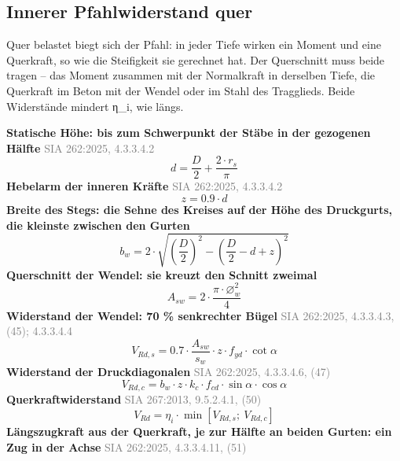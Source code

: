 \documentclass[11pt,a4paper]{article}
\newcommand{\normref}[1]{{\small\textcolor{gray}{#1}}}
\begin{document}
\subsection{Innerer Pfahlwiderstand quer}
Quer belastet biegt sich der Pfahl: in jeder Tiefe wirken ein Moment und eine Querkraft, so wie die Steifigkeit sie gerechnet hat. Der Querschnitt muss beide tragen -- das Moment zusammen mit der Normalkraft in derselben Tiefe, die Querkraft im Beton mit der Wendel oder im Stahl des Tragglieds. Beide Widerstände mindert η\_i, wie längs.

\noindent\textbf{Statische Höhe: bis zum Schwerpunkt der Stäbe in der gezogenen Hälfte} \hfill \normref{SIA 262:2025, 4.3.3.4.2}
\begin{equation*}
d = \frac{D}{2} + \frac{2 \cdot r_s}{\pi}
\end{equation*}
\noindent\textbf{Hebelarm der inneren Kräfte} \hfill \normref{SIA 262:2025, 4.3.3.4.2}
\begin{equation*}
z = 0.9 \cdot d
\end{equation*}
\noindent\textbf{Breite des Stegs: die Sehne des Kreises auf der Höhe des Druckgurts, die kleinste zwischen den Gurten}
\begin{equation*}
b_w = 2 \cdot \sqrt{\left(\frac{D}{2}\right)^{2} - \left(\frac{D}{2} - d + z\right)^{2}}
\end{equation*}
\noindent\textbf{Querschnitt der Wendel: sie kreuzt den Schnitt zweimal}
\begin{equation*}
A_{sw} = 2 \cdot \frac{\pi \cdot \varnothing_w^{2}}{4}
\end{equation*}
\noindent\textbf{Widerstand der Wendel: 70 \% senkrechter Bügel} \hfill \normref{SIA 262:2025, 4.3.3.4.3, (45); 4.3.3.4.4}
\begin{equation*}
V_{Rd,s} = 0.7 \cdot \frac{A_{sw}}{s_w} \cdot z \cdot f_{yd} \cdot \cot \alpha
\end{equation*}
\noindent\textbf{Widerstand der Druckdiagonalen} \hfill \normref{SIA 262:2025, 4.3.3.4.6, (47)}
\begin{equation*}
V_{Rd,c} = b_w \cdot z \cdot k_c \cdot f_{cd} \cdot \sin \alpha \cdot \cos \alpha
\end{equation*}
\noindent\textbf{Querkraftwiderstand} \hfill \normref{SIA 267:2013, 9.5.2.4.1, (50)}
\begin{equation*}
V_{Rd} = \eta_i \cdot \min\left[V_{Rd,s};\ V_{Rd,c}\right]
\end{equation*}
\noindent\textbf{Längszugkraft aus der Querkraft, je zur Hälfte an beiden Gurten: ein Zug in der Achse} \hfill \normref{SIA 262:2025, 4.3.3.4.11, (51)}
\end{document}
